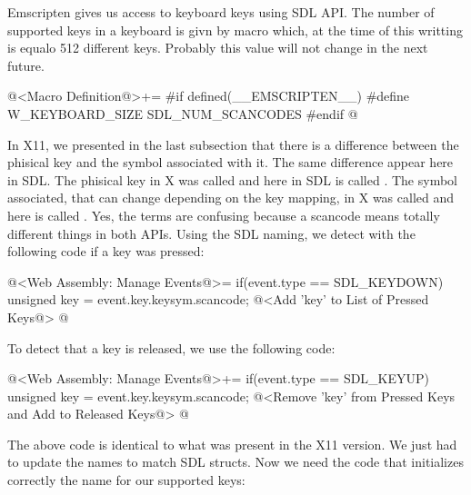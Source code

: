 
Emscripten gives us access to keyboard keys using SDL API. The number
of supported keys in a keyboard is givn by
macro  which, at the time of this
writting is equalo 512 different keys. Probably this value will not
change in the next future.

\iniciocodigo
@<Macro Definition@>+=
#if defined(__EMSCRIPTEN__)
#define W_KEYBOARD_SIZE SDL_NUM_SCANCODES
#endif
@
\fimcodigo

In X11, we presented in the last subsection that there is a difference
between the phisical key and the symbol associated with it. The same
difference appear here in SDL. The phisical key in X was
called  and here in SDL is
called . The symbol associated, that can change
depending on the key mapping, in X was called  and
here is called . Yes, the terms are confusing
because a scancode means totally different things in both APIs. Using
the SDL naming, we detect with the following code if a key was pressed:

\iniciocodigo
@<Web Assembly: Manage Events@>=
if(event.type == SDL_KEYDOWN){
  unsigned key = event.key.keysym.scancode;
  @<Add 'key' to List of Pressed Keys@>
}
@
\fimcodigo

To detect that a key is released, we use the following code:

\iniciocodigo
@<Web Assembly: Manage Events@>+=
if(event.type == SDL_KEYUP){
  unsigned key = event.key.keysym.scancode;
  @<Remove 'key' from Pressed Keys and Add to Released Keys@>
}
@
\fimcodigo

The above code is identical to what was present in the X11 version. We
just had to update the names to match SDL structs. Now we need the
code that initializes correctly the name for our supported keys:

